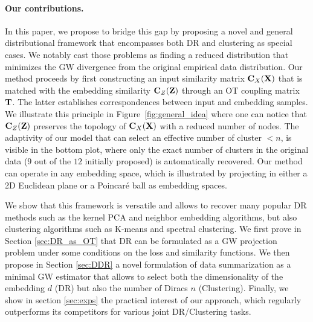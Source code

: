 \paragraph{Our contributions.} In this paper, we propose to bridge this gap by
proposing a novel and general distributional framework that encompasses both DR and clustering
as special cases. We notably cast those problems as finding a reduced distribution that minimizes the GW divergence from the original empirical data distribution.
Our method proceeds by first constructing an input similarity matrix
${\mathbf{C}}_X({\mathbf{X}})$ that is matched with the embedding similarity ${\mathbf{C}}_Z({\mathbf{Z}})$ through
an OT coupling matrix ${\mathbf{T}}$. The latter establishes correspondences between
input and embedding samples. We illustrate this principle in
Figure~\ref{fig:general_idea} where one can notice that ${\mathbf{C}}_Z({\mathbf{Z}})$ preserves
the topology of ${\mathbf{C}}_X({\mathbf{X}})$ with a reduced number of nodes. The adaptivity of
our model that can select an effective number of cluster $<n$, is visible in the
bottom plot, where only the exact number of clusters in the original data ($9$ out of the $12$
initially proposed) is automatically recovered. Our method can operate in any embedding space, which is illustrated by
projecting in either a 2D Euclidean plane or a Poincaré ball as embedding
spaces.

We show that this framework is versatile and allows to recover many popular DR
methods such as the kernel PCA and neighbor embedding algorithms, but also clustering 
algorithms such as K-means and spectral clustering. We first prove in Section
\ref{sec:DR_as_OT} that DR can be formulated as a GW projection problem under
some conditions on the loss and similarity functions. We then propose in Section
\ref{sec:DDR} a novel formulation of data summarization as a minimal GW estimator that allows
to select both the dimensionality of the embedding $d$ (DR) but also the number of Diracs
$n$ (Clustering).
Finally, we show in section \ref{sec:exps} the practical interest of our approach, which regularly outperforms its competitors for various joint DR/Clustering tasks.

